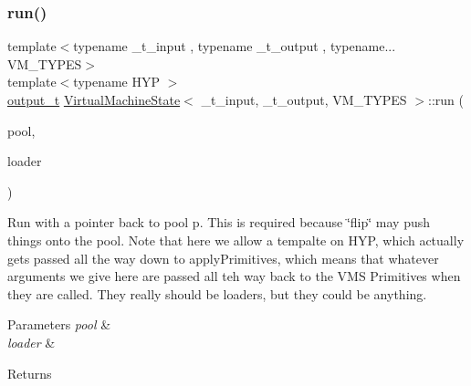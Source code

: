 \subsubsection{\texorpdfstring{run()}{run()}\hspace{0.1cm}{\footnotesize\ttfamily [2/2]}}
{\footnotesize\ttfamily template$<$typename \+\_\+t\+\_\+input , typename \+\_\+t\+\_\+output , typename... V\+M\+\_\+\+T\+Y\+P\+ES$>$ \\
template$<$typename H\+YP $>$ \\
\hyperlink{class_virtual_machine_state_a005a025f97d9505b00e7f9f0e99002bb}{output\+\_\+t} \hyperlink{class_virtual_machine_state}{Virtual\+Machine\+State}$<$ \+\_\+t\+\_\+input, \+\_\+t\+\_\+output, V\+M\+\_\+\+T\+Y\+P\+ES $>$\+::run (\begin{DoxyParamCaption}\item[{\hyperlink{class_virtual_machine_pool}{Virtual\+Machine\+Pool}$<$ \hyperlink{class_virtual_machine_state}{Virtual\+Machine\+State}$<$ \hyperlink{class_virtual_machine_state_a04c5592dddd5b9ffdae5a509d73127dd}{input\+\_\+t}, \hyperlink{class_virtual_machine_state_a005a025f97d9505b00e7f9f0e99002bb}{output\+\_\+t}, V\+M\+\_\+\+T\+Y\+P\+E\+S... $>$$>$ $\ast$}]{pool,  }\item[{H\+YP $\ast$}]{loader }\end{DoxyParamCaption})\hspace{0.3cm}{\ttfamily [inline]}}

Run with a pointer back to pool p. This is required because \char`\"{}flip\char`\"{} may push things onto the pool. Note that here we allow a tempalte on H\+YP, which actually gets passed all the way down to apply\+Primitives, which means that whatever arguments we give here are passed all teh way back to the V\+MS Primitives when they are called. They really should be loaders, but they could be anything. 
\begin{DoxyParams}{Parameters}
{\em pool} & \\
\hline
{\em loader} & \\
\hline
\end{DoxyParams}
\begin{DoxyReturn}{Returns}

\end{DoxyReturn}
\mbox{\label{class_virtual_machine_state_a580428f53e64cde8aef3c0a6a79838ec}} 

